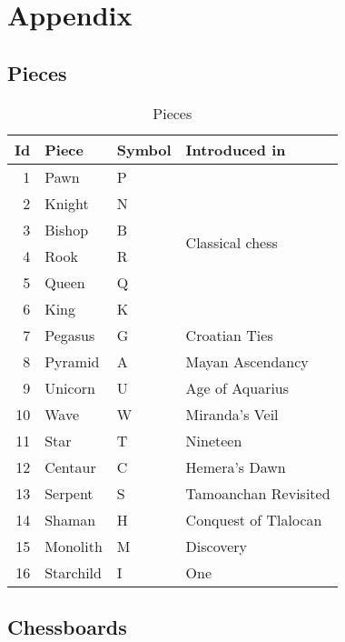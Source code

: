 

\chapter*{Appendix}
\label{ch:Appendix}

\section*{Pieces}
\label{sec:Appendix/Pieces}

\begin{table}[!h]
\centering
\begin{tabular}{ rlll }
\toprule
\textbf{Id} & \textbf{Piece} & \textbf{Symbol} & \textbf{Introduced in} \\
\midrule
1 & Pawn & P & \multirow{6}{*}{Classical chess} \\
2 & Knight & N & \\
3 & Bishop & B & \\
4 & Rook & R & \\
5 & Queen & Q & \\
6 & King & K & \\ \cmidrule{1-4}
7 & Pegasus & G & Croatian Ties \\
8 & Pyramid & A & Mayan Ascendancy \\
9 & Unicorn & U & Age of Aquarius \\
10 & Wave & W & Miranda's Veil \\
11 & Star & T & Nineteen \\
12 & Centaur & C & Hemera's Dawn \\
13 & Serpent & S & Tamoanchan Revisited \\
14 & Shaman & H & Conquest of Tlalocan \\
15 & Monolith & M & Discovery \\
16 & Starchild & I & One \\
\bottomrule
\end{tabular}
\caption{Pieces}
\label{tbl:Appendix/Pieces}
\end{table}

\clearpage %

\section*{Chessboards}
\label{sec:Appendix/Chessboards}

